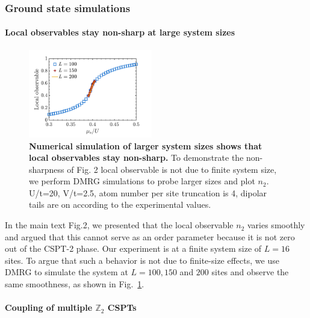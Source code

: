 \documentclass[preprint,superscriptaddress,floatfix, nofootinbib]{revtex4-2}
\begin{document}
\subsubsection*{Ground state simulations}

\paragraph*{Local observables stay non-sharp at large system sizes}

\begin{figure}
    \centering
    \includegraphics[width=0.48\textwidth]{figures/large_size_local_observable.pdf}
    \caption{\textbf{Numerical simulation of larger system sizes shows that local observables stay non-sharp.} To demonstrate the non-sharpness of Fig. 2 local observable is not due to finite system size, we perform DMRG simulations to probe larger sizes and plot $n_2$. U/t=20, V/t=2.5, atom number per site truncation is 4, dipolar tails are on according to the experimental values.
    }
    \label{fig: large_size_local_observable}
\end{figure}

In the main text Fig.2, we presented that the local observable $n_2$ varies smoothly and argued that this cannot serve as an order parameter because it is not zero out of the CSPT-2 phase. Our experiment is at a finite system size of $L=16$ sites. To argue that such a behavior is not due to finite-size effects, we use DMRG to simulate the system at $L=100, 150$ and $200$ sites and observe the same smoothness, as shown in Fig.~\ref{fig: large_size_local_observable}.

\paragraph*{Coupling of multiple $\mathbb{Z}_2$ CSPTs}
\end{document}

